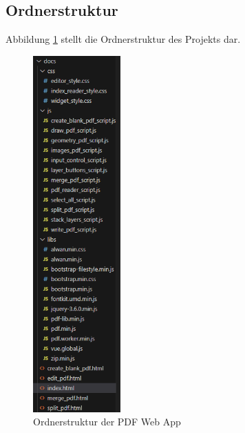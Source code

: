 \subsection{Ordnerstruktur}
Abbildung \ref{fig:folders} stellt die Ordnerstruktur des Projekts dar. 

\begin{figure}[!htbp]
	\centering
	\includegraphics[width=0.3\textwidth]{"images/folders.png"}
	\caption{Ordnerstruktur der PDF Web App}
	\label{fig:folders}
\end{figure}

